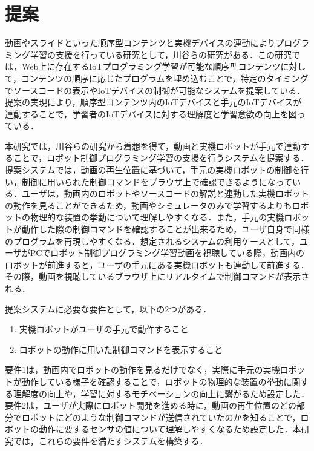 \documentclass{ujarticle}
\begin{document}
\section{提案}
動画やスライドといった順序型コンテンツと実機デバイスの連動によりプログラミング学習の支援を行っている研究として，川谷らの研究\cite{Kawatani}がある．この研究では，Web上に存在するIoTプログラミング学習が可能な順序型コンテンツに対して，コンテンツの順序に応じたプログラムを埋め込むことで，特定のタイミングでソースコードの表示やIoTデバイスの制御が可能なシステムを提案している．提案の実現により，順序型コンテンツ内のIoTデバイスと手元のIoTデバイスが連動することで，学習者のIoTデバイスに対する理解度と学習意欲の向上を図っている．
\par 本研究では，川谷らの研究から着想を得て，動画と実機ロボットが手元で連動することで，ロボット制御プログラミング学習の支援を行うシステムを提案する．提案システムでは，動画の再生位置に基づいて，手元の実機ロボットの制御を行い，制御に用いられた制御コマンドをブラウザ上で確認できるようになっている．ユーザは，動画内のロボットやソースコードの解説と連動した実機ロボットの動作を見ることができるため，動画やシミュレータのみで学習するよりもロボットの物理的な装置の挙動について理解しやすくなる．また，手元の実機ロボットが動作した際の制御コマンドを確認することが出来るため，ユーザ自身で同様のプログラムを再現しやすくなる．想定されるシステムの利用ケースとして，ユーザがPCでロボット制御プログラミング学習動画を視聴している際，動画内のロボットが前進すると，ユーザの手元にある実機ロボットも連動して前進する．その際，動画を視聴しているブラウザ上にリアルタイムで制御コマンドが表示される．
\par 提案システムに必要な要件として，以下の2つがある．

\begin{enumerate}
  \item 実機ロボットがユーザの手元で動作すること
  \item ロボットの動作に用いた制御コマンドを表示すること
\end{enumerate}

要件1は，動画内でロボットの動作を見るだけでなく，実際に手元の実機ロボットが動作している様子を確認することで，ロボットの物理的な装置の挙動に関する理解度の向上や，学習に対するモチベーションの向上に繋がるため設定した．要件2は，ユーザが実際にロボット開発を進める時に，動画の再生位置のどの部分でロボットにどのような制御コマンドが送信されていたのかを知ることで，ロボットの動作に要するセンサの値について理解しやすくなるため設定した．本研究では，これらの要件を満たすシステムを構築する．
\end{document}
